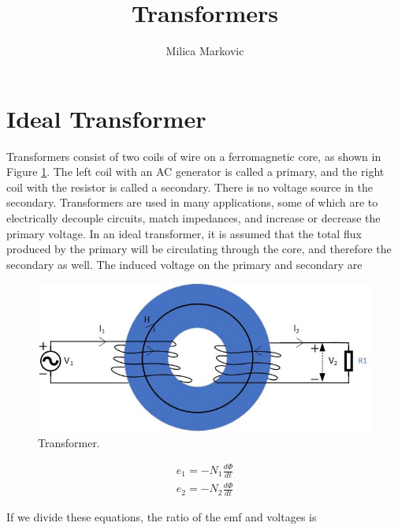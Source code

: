 \documentclass{ximera}
\title{Transformers}
\author{Milica Markovic}
\begin{document}
  
\begin{abstract}  

\end{abstract}  
\maketitle    




\section{Ideal Transformer}

Transformers consist of two coils of wire on a ferromagnetic core, as shown in Figure \ref{fig:Transformer}. The left coil with an AC generator is called a primary, and the right coil with the resistor is called a secondary. There is no voltage source in the secondary. Transformers are used in many applications, some of which are to electrically decouple circuits, match impedances, and increase or decrease the primary voltage. In an ideal transformer, it is assumed that the total flux produced by the primary will be circulating through the core, and therefore the secondary as well. The induced voltage on the primary and secondary are 

\begin{figure}[htbp]
\begin{center}
\includegraphics[scale=0.8]{../jpg/Transformer.jpg}
\end{center}
\caption{Transformer.}
\label{fig:Transformer}
\end{figure}


\begin{eqnarray}
e_1=-N_1 \frac{d\Phi}{dt} \\
e_2=-N_2 \frac{d\Phi}{dt}
\end{eqnarray}

If we divide these equations, the ratio of the emf and voltages is
\end{document}
